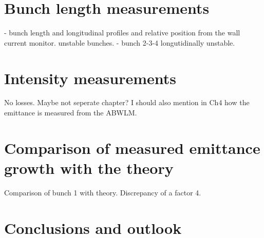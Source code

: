 \section{Bunch length measurements}\label{sec:bunch_length_measurements_2018}
    - bunch length and longitudinal profiles and relative position from the wall current monitor.  unstable bunches.
    - bunch 2-3-4 longutidinally unstable.
 
\section{Intensity measurements}\label{sec:intensity_measurements_2018}
No losses. Maybe not seperate chapter?
I should also mention in Ch4 how the emittance is measured from the ABWLM.

\section{Comparison of measured emittance growth with the theory}\label{sec:meas_2018_vs_theory}

Comparison of bunch 1 with theory. Discrepancy of a factor 4.


 \section{Conclusions and outlook}\label{sec:MD2018_summary}
